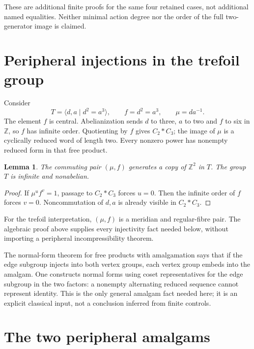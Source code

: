 \documentclass[11pt]{article}
\newtheorem{lemma}[theorem]{Lemma}
\newcommand{\Z}{\mathbb Z}
\begin{document}
These are additional finite proofs for the same four retained
cases, not additional named equalities. Neither minimal action
degree nor the order of the full two-generator image is claimed.

\section{Peripheral injections in the trefoil group}

Consider
\[
                 T=\langle d,a\mid d^2=a^3\rangle,
 \qquad f=d^2=a^3,\qquad \mu=da^{-1}.
\]
The element $f$ is central. Abelianization sends $d$ to three,
$a$ to two and $f$ to six in $\Z$, so $f$ has infinite order.
Quotienting by $f$ gives $C_2*C_3$; the image of $\mu$ is a
cyclically reduced word of length two. Every nonzero power
has nonempty reduced form in that free product.

\begin{lemma}\label{lem:peripheral}
The commuting pair $(\mu,f)$ generates a copy of $\Z^2$ in $T$.
The group $T$ is infinite and nonabelian.
\end{lemma}
\begin{proof}
If $\mu^u f^v=1$, passage to $C_2*C_3$ forces $u=0$.
Then the infinite order of $f$ forces $v=0$. Noncommutation
of $d,a$ is already visible in $C_2*C_3$.
\end{proof}

For the trefoil interpretation, $(\mu,f)$ is a meridian and
regular-fibre pair. The algebraic proof above supplies every
injectivity fact needed below, without importing a peripheral
incompressibility theorem.

The normal-form theorem for free products with amalgamation
\cite{serre} says that if the edge subgroup injects into both
vertex groups, each vertex group embeds into the amalgam.
One constructs normal forms using coset representatives for
the edge subgroup in the two factors: a nonempty alternating
reduced sequence cannot represent identity. This is the only
general amalgam fact needed here; it is an explicit classical
input, not a conclusion inferred from finite controls.

\section{The two peripheral amalgams}
\end{document}
